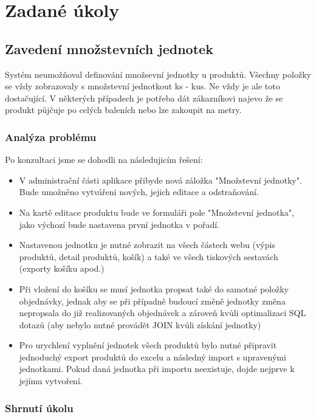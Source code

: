 \chapter{Zadané úkoly}

\section{Zavedení množstevních jednotek}

Systém neumožňoval definování množsevní jednotky u produktů. Všechny položky se vždy zobrazovaly s množstevní jednotkout ks - kus. Ne vždy je ale toto dostačující. V některých případech je potřeba dát zákazníkovi najevo že se produkt půjčuje po celých baleních nebo lze zakoupit na metry.

\subsection{Analýza problému}

Po konzultaci jsme se dohodli na následujicím řešení:



\begin{itemize}
    \item V administrační části aplikace přibyde nová záložka "Množstevní jednotky". Bude umožněno vytvářeni nových, jejich editace a odstraňování.
    \item Na kartě editace produktu bude ve formuláři pole "Množstevní jednotka", jako výchozí bude nastavena první jednotka v pořadí.
    \item Nastavenou jednotku je nutné zobrazit na všech částech webu (výpis produktů, detail produktů, košík) a také ve všech tiskových sestavách (exporty košíku apod.) 
    \item Při vložení do košíku se musí jednotka propsat také do samotné položky objednávky, jednak aby se při případně budoucí změně jednotky změna nepropsala do již realizovaných objednávek a zároveň kvůli optimalizaci SQL dotazů (aby nebylo nutné provádět JOIN kvůli získání jednotky)
    \item Pro urychlení vyplnění jednotek všech produktů bylo nutné připravit jednoduchý export produktů do excelu a následný import s upravenými jednotkami. Pokud daná jednotka při importu neexistuje, dojde nejprve k jejímu vytvoření.
\end{itemize}

\subsection{Shrnutí úkolu}

